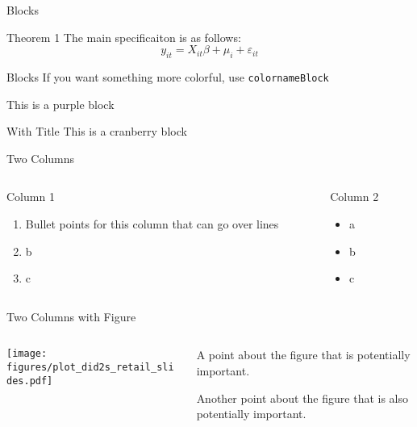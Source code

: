 \documentclass[aspectratio=169,t,11pt,table]{beamer}
\begin{document}
\begin{frame}{Blocks}
  \begin{block}{Theorem 1}
  The main specificaiton is as follows: 
  $$
    y_{it} = X_{it} \beta + \mu_i + \varepsilon_{it}
  $$
  \end{block}
\end{frame}

\begin{frame}{Blocks}
  If you want something more colorful, use \texttt{colornameBlock}
  \begin{purpleBlock}{}
    This is a purple block
  \end{purpleBlock}

  \begin{cranberryBlock}{With Title}
  This is a cranberry block
  \end{cranberryBlock}
\end{frame}

\begin{frame}{Two Columns}
  \begin{columns}[T]
    \begin{column}{.50\textwidth}
      \vspace{0pt}
      Column 1

      \begin{enumerate}
        \item Bullet points for this column that can go over lines
        \item b
        \item c
      \end{enumerate}
    \end{column}
    
    \hfill
    
    \begin{column}{.50\textwidth}
      Column 2

      \begin{itemize}
        \item a
        \item b
        \item c
      \end{itemize}
    \end{column}
  \end{columns}
\end{frame}

\begin{frame}{Two Columns with Figure}
  \begin{columns}[T]
    \begin{column}{.6\textwidth}
      \texttt{[image: figures/plot\_did2s\_retail\_slides.pdf]}
    \end{column}
    \hfill
    \begin{column}{.4\textwidth}
      A point about the figure that is potentially important.
      
      \bigskip
      Another point about the figure that is also potentially important.
    \end{column}
  \end{columns}
\end{frame}
\end{document}
